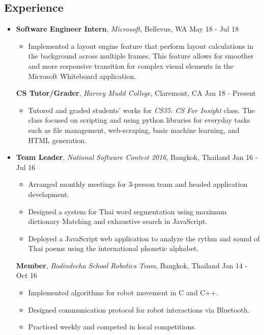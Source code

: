 \documentclass[10.5pt,letterpaper]{article}
\begin{document}
\subsection*{Experience}
  \begin{itemize}
    \parskip=-0.2em
    
    \item[]
    {\textbf{Software Engineer Intern}, \textit{Microsoft}, Bellevue, WA \hfill {May 18 - Jul 18}}
    \begin{itemize}[label=\textbullet]
      \itemsep0em
      \item Implemented a layout engine feature that perform layout calculations in the background across multiple frames. This feature allows for smoother and more responsive transition for complex visual elements in the Microsoft Whiteboard application.
      
    \end{itemize}
    {\textbf{CS Tutor/Grader}, \textit{Harvey Mudd College}, Claremont, CA \hfill {Jan 18 - Present}}
    \begin{itemize}[label=\textbullet]
      \itemsep0em
      \item Tutored and graded students' works for \textit{CS35: CS For Insight} class. The class focused on scripting and using python libraries for everyday tasks such as file management, web-scraping, basic machine learning, and HTML generation.
      
    \end{itemize}
    
    \item[]
    {\textbf{Team Leader}, \textit{National Software Contest 2016}, Bangkok, Thailand \hfill {Jan 16 - Jul 16}}
    \begin{itemize}[label=\textbullet]
      \itemsep0em
      \item Arranged monthly meetings for 3-person team and headed application development.
      \item Designed a system for Thai word segmentation using maximum dictionary Matching and exhaustive search in JavaScript.
      \item Deployed a JavaScript web application to analyze the rythm and sound of Thai poems using the international phonetic alphabet.
      
    \end{itemize}
    
    {\textbf{Member}, \textit{Bodindecha School Robotics Team}, Bangkok, Thailand \hfill {Jan 14 - Oct 16}}
     
    \begin{itemize}[label=\textbullet]
      \itemsep0em
      \item Implemented algorithms for robot movement in C and C++.
      \item Designed communication protocol for robot interactions via Bluetooth.
      \item Practiced weekly and competed in local competitions.
      
    \end{itemize}


  \end{itemize}
  
\end{document}
